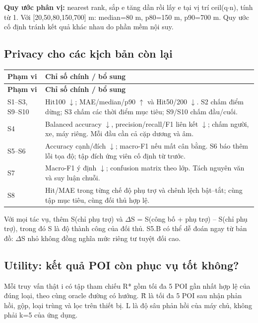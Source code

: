 \documentclass[10pt,a4paper]{article}
\begin{document}
\textbf{Quy ước phân vị:} nearest rank, sắp e tăng dần rồi lấy e tại vị trí ceil(q$\cdot$n), tính từ 1. Với [20,50,80,150,700] m: median=80 m, p80=150 m, p90=700 m. Quy ước cố định tránh kết quả khác nhau do phần mềm nội suy.

\subsection{Privacy cho các kịch bản còn lại}
\begingroup\small
\begin{longtable}{@{}P{4.004cm}P{12.914cm}@{}}
\toprule
\textbf{Phạm vi} & \textbf{Chỉ số chính / bổ sung}\\\midrule
\endfirsthead
\toprule
\textbf{Phạm vi} & \textbf{Chỉ số chính / bổ sung}\\\midrule
\endhead
\bottomrule\endfoot
S1–S3, S9–S10 & Hit100 $\downarrow$; MAE/median/p90 $\uparrow$ và Hit50/200 $\downarrow$. S2 chấm điểm dừng; S3 chấm các thời điểm mục tiêu; S9/S10 chấm đầu/cuối.\\
\addlinespace[3pt]
S4 & Balanced accuracy $\downarrow$, precision/recall/F1 liên kết $\downarrow$; chấm người, xe, máy riêng. Mỗi đầu cần cả cặp dương và âm.\\
\addlinespace[3pt]
S5–S6 & Accuracy cạnh/đích $\downarrow$; macro-F1 nếu mất cân bằng. S6 báo thêm lỗi tọa độ; tập đích ứng viên cố định từ trước.\\
\addlinespace[3pt]
S7 & Macro-F1 ý định $\downarrow$; confusion matrix theo lớp. Tách nguyên văn và suy luận chuỗi.\\
\addlinespace[3pt]
S8 & Hit/MAE trong từng chế độ phụ trợ và chênh lệch bật–tắt; cùng tập mục tiêu, cùng đối thủ hợp lệ.\\
\end{longtable}
\endgroup
Với mọi tác vụ, thêm S(chỉ phụ trợ) và $\Delta$S = S(công bố + phụ trợ) -- S(chỉ phụ trợ), trong đó S là độ thành công của đối thủ. S5.B có thể dễ đoán ngay từ bản đồ: $\Delta$S nhỏ không đồng nghĩa mức riêng tư tuyệt đối cao.


\clearpage
\subsection{Utility: kết quả POI còn phục vụ tốt không?}
Mỗi truy vấn thật i có tập tham chiếu R* gồm tối đa 5 POI gần nhất hợp lệ của đúng loại, theo cùng oracle đường có hướng. R̂ là tối đa 5 POI sau nhận phản hồi, gộp, loại trùng và lọc trên thiết bị. L là độ sâu phản hồi của máy chủ, không phải k=5 của ứng dụng.
\end{document}
